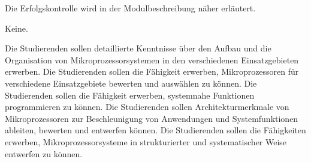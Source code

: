 \begin{course}

\setdoclanguagegerman
{}



\coursehead


\label{cour_7169.dp_997}


\begin{styleenv}
\begin{assessment}
Die Erfolgskontrolle wird in der Modulbeschreibung näher erläutert.


\end{assessment}

\begin{conditions}Keine.\end{conditions}


\end{styleenv}

\begin{learningoutcomes}
Die Studierenden sollen detaillierte Kenntnisse über den Aufbau und die Organisation von Mikroprozessorsystemen in den verschiedenen Einsatzgebieten erwerben. \newline
Die Studierenden sollen die Fähigkeit erwerben, Mikroprozessoren für verschiedene Einsatzgebiete bewerten und auswählen zu können.\newline
Die Studierenden sollen die Fähigkeit erwerben, systemnahe Funktionen programmieren zu können.\newline
Die Studierenden sollen Architekturmerkmale von Mikroprozessoren zur Beschleunigung von Anwendungen und Systemfunktionen ableiten, bewerten und entwerfen können.\newline
Die Studierenden sollen die Fähigkeiten erwerben, Mikroprozessorsysteme in strukturierter und systematischer Weise entwerfen zu können.


\end{learningoutcomes}


\end{course}
